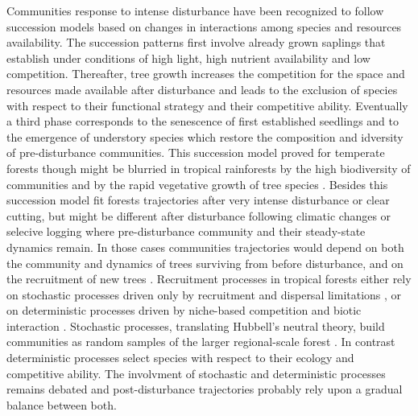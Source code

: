\documentclass[fleqn,10pt]{ArtEcoFoG} %
\begin{document}
Communities response to intense disturbance have been recognized to
follow succession models based on changes in interactions among species
and resources availability. The succession patterns first involve
already grown saplings that establish under conditions of high light,
high nutrient availability and low competition. Thereafter, tree growth
increases the competition for the space and resources made available
after disturbance and leads to the exclusion of species with respect to
their functional strategy and their competitive ability. Eventually a
third phase corresponds to the senescence of first established seedlings
and to the emergence of understory species which restore the composition
and idversity of pre-disturbance communities. This succession model
proved for temperate forests though might be blurried in tropical
rainforests by the high biodiversity of communities and by the rapid
vegetative growth of tree species \citep{Denslow2000}. Besides this
succession model fit forests trajectories after very intense disturbance
or clear cutting, but might be different after disturbance following
climatic changes or selecive logging where pre-disturbance community and
their steady-state dynamics remain. In those cases communities
trajectories would depend on both the community and dynamics of trees
surviving from before disturbance, and on the recruitment of new trees
\citep{Herault2018}. Recruitment processes in tropical forests either
rely on stochastic processes driven only by recruitment and dispersal
limitations \citep{Hurtt1995, Hubbell2001}, or on deterministic
processes driven by niche-based competition and biotic interaction
\citep{Adler2007}. Stochastic processes, translating Hubbell's neutral
theory, build communities as random samples of the larger regional-scale
forest \citep{Hubbell2001, Chave2004}. In contrast deterministic
processes select species with respect to their ecology and competitive
ability. The involvment of stochastic and deterministic processes
remains debated and post-disturbance trajectories probably rely upon a
gradual balance between both.
\end{document}
